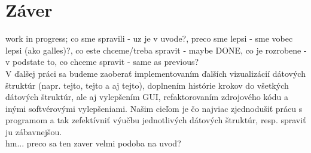 \section{Záver}
work in progress; co sme spravili - uz je v uvode?, preco sme lepsi - sme vobec lepsi (ako galles)?, co este chceme/treba spravit - maybe DONE, co je rozrobene - v podstate to, co chceme spravit - same as previous?
\\
V ďalšej práci sa budeme zaoberať implementovaním ďalších vizualizácií dátových štruktúr (napr. tejto, tejto a aj tejto), doplnením histórie krokov do všetkých dátových štruktúr, ale aj vylepšením GUI, refaktorovaním zdrojového kódu a inými softvérovými vylepšeniami. Našim cieľom je čo najviac zjednodušiť prácu s programom a tak zefektívniť výučbu jednotlivých dátových štruktúr, resp. spraviť ju zábavnejšou.
\\
hm... preco sa ten zaver velmi podoba na uvod?
